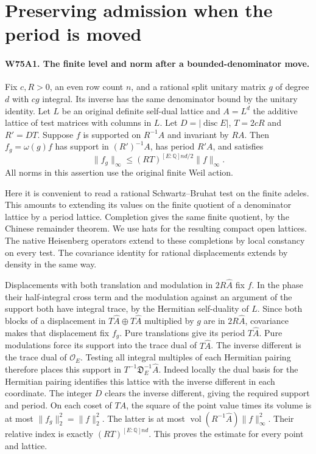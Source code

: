 \section{Preserving admission when the period is moved}

\paragraph{W75A1. The finite level and norm after a bounded-denominator move.}
Fix $c,R>0$, an even row count $n$, and a rational split unitary
matrix $g$ of degree $d$ with $cg$ integral. Its inverse has the
same denominator bound by the unitary identity. Let $L$ be an
original definite self-dual lattice and $A=L^d$ the additive lattice
of test matrices with columns in $L$. Let $D=|\operatorname{disc} E|$,
$T=2cR$ and $R'=DT$. Suppose $f$ is supported on $R^{-1}A$ and
invariant by $RA$. Then $f_g=\omega(g)f$ has support in
$(R')^{-1}A$, has period $R'A$, and satisfies
\[
              \|f_g\|_\infty
              \le (RT)^{[E:\mathbb Q]nd/2}\|f\|_\infty .
\]
All norms in this assertion use the original finite Weil action.

Here it is convenient to read a rational Schwartz--Bruhat test on
the finite adeles. This amounts to extending its values on the
finite quotient of a denominator lattice by a period lattice.
Completion gives the same finite quotient, by the Chinese remainder
theorem. We use hats for the resulting compact open lattices. The
native Heisenberg operators extend to these completions by local
constancy on every test. The covariance identity for rational
displacements extends by density in the same way.

Displacements with both translation and modulation in $2R\widehat A$
fix $f$. In the phase their half-integral cross term and the
modulation against an argument of the support both have integral
trace, by the Hermitian self-duality of $L$. Since both blocks of
a displacement in $T\widehat A\oplus T\widehat A$ multiplied by
$g$ are in $2R\widehat A$, covariance makes that displacement fix
$f_g$. Pure translations give its period $T\widehat A$.
Pure modulations force its support into the trace dual of
$T\widehat A$. The inverse different is the trace dual of
$\mathcal O_E$. Testing all integral multiples of each Hermitian
pairing therefore places this support in
$T^{-1}\mathfrak D_E^{-1}\widehat A$. Indeed locally the dual
basis for the Hermitian pairing identifies this lattice with the
inverse different in each coordinate. The integer $D$ clears the
inverse different, giving the required support and period.
On each coset of $T\widehat A$, the square of the point value times
its volume is at most $\|f_g\|_2^2=\|f\|_2^2$. The latter is at
most $\operatorname{vol}(R^{-1}\widehat A)\|f\|_\infty^2$.
Their relative index is exactly $(RT)^{[E:\mathbb Q]nd}$.
This proves the estimate for every point and lattice.

